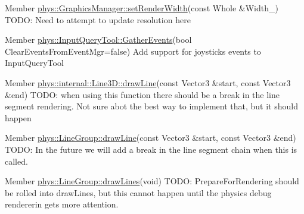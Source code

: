 \label{dd/da0/todo__todo000012}
\hypertarget{dd/da0/todo__todo000012}{}
 
\begin{DoxyDescription}
\item[Member \hyperlink{classphys_1_1GraphicsManager_aea5fb5808a23fa29c8522c396ac0d6b5}{phys::GraphicsManager::setRenderWidth}(const Whole \&Width\_\-) ]TODO: Need to attempt to update resolution here 
\end{DoxyDescription}

\label{dd/da0/todo__todo000014}
\hypertarget{dd/da0/todo__todo000014}{}
 
\begin{DoxyDescription}
\item[Member \hyperlink{classphys_1_1InputQueryTool_a9779d812418f1fddb0880df0c607242b}{phys::InputQueryTool::GatherEvents}(bool ClearEventsFromEventMgr=false) ]Add support for joysticks events to InputQueryTool 
\end{DoxyDescription}

\label{dd/da0/todo__todo000015}
\hypertarget{dd/da0/todo__todo000015}{}
 
\begin{DoxyDescription}
\item[Member \hyperlink{classphys_1_1internal_1_1Line3D_a31bf19dc06547cbe042e1ddfbcf672f3}{phys::internal::Line3D::drawLine}(const Vector3 \&start, const Vector3 \&end) ]TODO: when using this function there should be a break in the line segment rendering. Not sure abot the best way to implement that, but it should happen 
\end{DoxyDescription}

\label{dd/da0/todo__todo000017}
\hypertarget{dd/da0/todo__todo000017}{}
 
\begin{DoxyDescription}
\item[Member \hyperlink{classphys_1_1LineGroup_a141db62ea17d94b9bce421e5df5a8d89}{phys::LineGroup::drawLine}(const Vector3 \&start, const Vector3 \&end) ]TODO: In the future we will add a break in the line segment chain when this is called. 
\end{DoxyDescription}

\label{dd/da0/todo__todo000018}
\hypertarget{dd/da0/todo__todo000018}{}
 
\begin{DoxyDescription}
\item[Member \hyperlink{classphys_1_1LineGroup_ade1bb4f8e1164e1b8d7aeabbc970b79d}{phys::LineGroup::drawLines}(void) ]TODO: PrepareForRendering should be rolled into drawLines, but this cannot happen until the physics debug rendererin gets more attention. 
\end{DoxyDescription}

